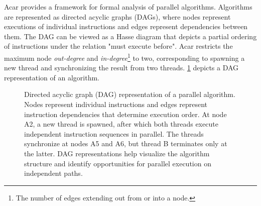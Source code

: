 \documentclass[english,12pt,a4paper,pdftex,sci,utf8]{aaltothesis}
\begin{document}
Acar \cite{acar2016parallel} provides a framework for formal analysis of parallel algorithms. Algorithms are represented as directed acyclic graphs (DAGs), where nodes represent executions of individual instructions and edges represent dependencies between them. The DAG can be viewed as a Hasse diagram that depicts a partial ordering of instructions under the relation "must execute before". Acar restricts the maximum node \emph{out-degree} and \emph{in-degree}\footnote{The number of edges extending out from or into a node.} to two, corresponding to spawning a new thread and synchronizing the result from two threads. \cref{fig:DAG-algo} depicts a DAG representation of an algorithm.

\begin{figure}[h]
\centering
{}
\caption{Directed acyclic graph (DAG) representation of a parallel algorithm. Nodes represent individual instructions and edges represent instruction dependencies that determine execution order. At node A2, a new thread is spawned, after which both threads execute independent instruction sequences in parallel. The threads synchronize at nodes A5 and A6, but thread B terminates only at the latter. DAG representations help visualize the algorithm structure and identify opportunities for parallel execution on independent paths.}
\label{fig:DAG-algo}
\end{figure}
\clearpage
\end{document}
